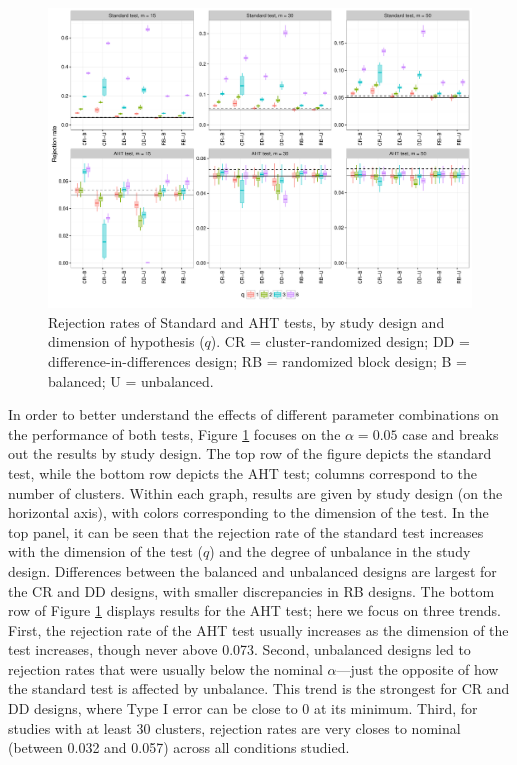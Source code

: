 \documentclass[draft]{ectaart}\usepackage[]{graphicx}\usepackage[]{color}
\newenvironment{knitrout}{}{} %
\begin{document}
\begin{knitrout}
\color{fgcolor}\begin{figure}

{\centering \includegraphics[width=\linewidth]{CR_fig/balance-1} 

}

\caption[Rejection rates of Standard and AHT tests, by study design and dimension of hypothesis (]{Rejection rates of Standard and AHT tests, by study design and dimension of hypothesis ($q$). CR = cluster-randomized design; DD = difference-in-differences design; RB = randomized block design; B = balanced; U = unbalanced.}\label{fig:balance}
\end{figure}


\end{knitrout}

In order to better understand the effects of different parameter combinations on the performance of both tests, Figure \ref{fig:balance} focuses on the $\alpha = 0.05$ case and breaks out the results by study design. The top row of the figure depicts the standard test, while the bottom row depicts the AHT test; columns correspond to the number of clusters.
Within each graph, results are given by study design (on the horizontal axis), with colors corresponding to the dimension of the test.
In the top panel, it can be seen that the rejection rate of the standard test increases with the dimension of the test ($q$) and the degree of unbalance in the study design.
Differences between the balanced and unbalanced designs are largest for the CR and DD designs, with smaller discrepancies in RB designs.
The bottom row of Figure \ref{fig:balance} displays results for the AHT test; here we focus on three trends.
First, the rejection rate of the AHT test usually increases as the dimension of the test increases, though never above 0.073.
Second, unbalanced designs led to rejection rates that were usually below the nominal $\alpha$---just the opposite of how the standard test is affected by unbalance. 
This trend is the strongest for CR and DD designs, where Type I error can be close to 0 at its minimum. 
Third, for studies with at least 30 clusters, rejection rates are very closes to nominal (between 0.032 and 0.057) across all conditions studied.
\end{document}
